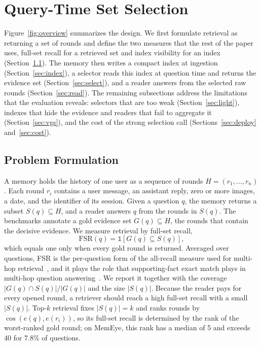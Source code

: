 \section{Query-Time Set Selection}
\label{sec:method}

Figure~\ref{fig:overview} summarizes the design. We first formulate retrieval as returning a set of rounds and define the two measures that the rest of the paper uses, full-set recall for a retrieved set and index visibility for an index (Section~\ref{sec:formulation}). The memory then writes a compact index at ingestion (Section~\ref{sec:index}), a selector reads this index at question time and returns the evidence set (Section~\ref{sec:select}), and a reader answers from the selected raw rounds (Section~\ref{sec:read}). The remaining subsections address the limitations that the evaluation reveals: selectors that are too weak (Section~\ref{sec:light}), indexes that hide the evidence and readers that fail to aggregate it (Section~\ref{sec:vgs}), and the cost of the strong selection call (Sections~\ref{sec:deploy} and~\ref{sec:cost}).

\subsection{Problem Formulation}
\label{sec:formulation}

A memory holds the history of one user as a sequence of rounds $H=(r_1,\dots,r_n)$. Each round $r_i$ contains a user message, an assistant reply, zero or more images, a date, and the identifier of its session. Given a question $q$, the memory returns a subset $S(q)\subseteq H$, and a reader answers $q$ from the rounds in $S(q)$. The benchmarks annotate a gold evidence set $G(q)\subseteq H$, the rounds that contain the decisive evidence. We measure retrieval by full-set recall,
\begin{equation}
\mathrm{FSR}(q)=\mathbb{1}\left[G(q)\subseteq S(q)\right],
\end{equation}
which equals one only when every gold round is returned. Averaged over questions, FSR is the per-question form of the all-recall measure used for multi-hop retrieval~\citep{gutierrez2024hipporag}, and it plays the role that supporting-fact exact match plays in multi-hop question answering~\citep{yang2018hotpotqa}. We report it together with the coverage $|G(q)\cap S(q)|/|G(q)|$ and the size $|S(q)|$. Because the reader pays for every opened round, a retriever should reach a high full-set recall with a small $|S(q)|$. Top-$k$ retrieval fixes $|S(q)|=k$ and ranks rounds by $\cos(e(q),e(r_i))$, so its full-set recall is determined by the rank of the worst-ranked gold round; on MemEye, this rank has a median of 5 and exceeds 40 for 7.8\% of questions.

